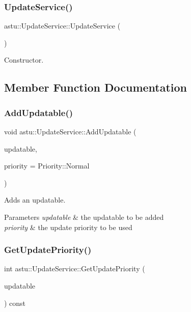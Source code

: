 \subsubsection{\texorpdfstring{Update\+Service()}{UpdateService()}}
{\footnotesize\ttfamily astu\+::\+Update\+Service\+::\+Update\+Service (\begin{DoxyParamCaption}{ }\end{DoxyParamCaption})}

Constructor. 

\subsection{Member Function Documentation}
\mbox{\label{classastu_1_1UpdateService_aeccc68d2764d15d0bc78c25b83bb2510}} 
\subsubsection{\texorpdfstring{Add\+Updatable()}{AddUpdatable()}}
{\footnotesize\ttfamily void astu\+::\+Update\+Service\+::\+Add\+Updatable (\begin{DoxyParamCaption}\item[{\hyperlink{classastu_1_1IUpdatable}{I\+Updatable} \&}]{updatable,  }\item[{int}]{priority = {\ttfamily Priority\+:\+:Normal} }\end{DoxyParamCaption})}

Adds an updatable.


\begin{DoxyParams}{Parameters}
{\em updatable} & the updatable to be added \\
\hline
{\em priority} & the update priority to be used \\
\hline
\end{DoxyParams}
\mbox{\label{classastu_1_1UpdateService_a7e8d2c8cd7238349f3a10a8d2c3ebe32}} 
\subsubsection{\texorpdfstring{Get\+Update\+Priority()}{GetUpdatePriority()}}
{\footnotesize\ttfamily int astu\+::\+Update\+Service\+::\+Get\+Update\+Priority (\begin{DoxyParamCaption}\item[{\hyperlink{classastu_1_1IUpdatable}{I\+Updatable} \&}]{updatable }\end{DoxyParamCaption}) const}

